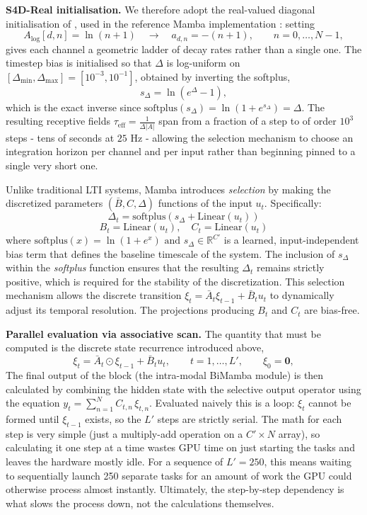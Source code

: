 \documentclass[11pt,a4paper]{article}
\begin{document}
\begin{enumerate}
		\textbf{S4D-Real initialisation.} We therefore adopt the real-valued diagonal initialisation of \cite{gu2022s4d}, used in the reference Mamba implementation \cite{gu2023mamba}: setting $$A_{\log}[d, n] = \ln(n+1) \quad \rightarrow \quad a_{d,n} = -(n+1), \qquad n = 0,\dots, N-1,$$ gives each channel a geometric ladder of decay rates rather than a single one. The timestep bias is initialised so that $\Delta$ is log-uniform on $[\Delta_{\min},\Delta_{\max}] = [10^{-3}, 10^{-1}]$, obtained by inverting the softplus, $$s_\Delta = \ln \left(e^{\Delta} - 1\right),$$ which is the exact inverse since $\text{softplus}(s_\Delta) = \ln(1+e^{s_\Delta}) = \Delta$. The resulting receptive fields $\tau_{\text{eff}} = \frac{1}{\Delta|A|}$ span from a fraction of a step to of order $10^3$ steps - tens of seconds at $25$ Hz - allowing the selection mechanism to choose an integration horizon per channel and per input rather than beginning pinned to a single very short one.

		Unlike traditional LTI systems, Mamba introduces \textit{selection} by making the discretized parameters $(\bar{B}, C, \Delta)$ functions of the input $u_t$. Specifically:
		$$ \Delta_t = \text{softplus}(s_{\Delta} + \text{Linear}(u_t)) $$
		$$ B_t = \text{Linear}(u_t), \quad C_t = \text{Linear}(u_t) $$
		where $ \text{softplus}(x) = \ln(1 + e^x) \text{ and } s_{\Delta} \in \mathbb{R}^{C'} $ is a learned, input-independent bias term that defines the baseline timescale of the system. The inclusion of $s_{\Delta}$ within the \textit{softplus} function ensures that the resulting $\Delta_t$ remains strictly positive, which is required for the stability of the discretization. This selection mechanism allows the discrete transition $\xi_t = \bar{A}_t \xi_{t-1} + \bar{B}_t u_t$ to dynamically adjust its temporal resolution. The projections producing $B_t$ and $C_t$ are bias-free.
		
    	    \textbf{Parallel evaluation via associative scan.} The quantity that must be computed is the discrete state recurrence introduced above, $$\xi_t = \bar{A}_t \odot \xi_{t-1} + \bar{B}_t u_t, \qquad t = 1,\dots,L', \qquad \xi_0 = \mathbf{0},$$
	    The final output of the block (the intra-modal BiMamba module) is then calculated by combining the hidden state with the selective output operator using the equation $y_t = \sum_{n=1}^{N} C_{t,n}\,\xi_{t,n}$.
	    Evaluated naively this is a loop: $\xi_t$ cannot be formed until $\xi_{t-1}$ exists, so the $L'$ steps are strictly serial. The math for each step is very simple (just a multiply-add operation on a $C' \times N$ array), so calculating it one step at a time wastes GPU time on just starting the tasks and leaves the hardware mostly idle. For a sequence of $L' = 250$, this means waiting to sequentially launch 250 separate tasks for an amount of work the GPU could otherwise process almost instantly. Ultimately, the step-by-step dependency is what slows the process down, not the calculations themselves.
		

\end{enumerate}
\end{document}

